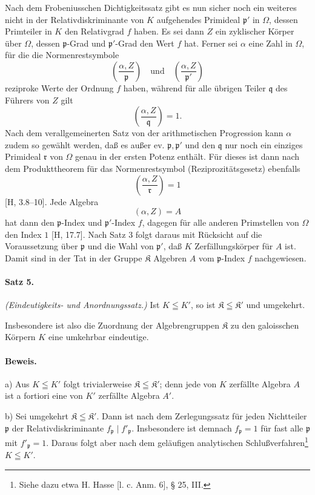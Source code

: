 Nach dem Frobeniusschen Dichtigkeitssatz gibt es nun sicher noch ein weiteres nicht in der Relativdiskriminante von \(K\) aufgehendes Primideal \(\mathfrak p'\) in \(\Omega\), dessen Primteiler in \(K\) den Relativgrad \(f\) haben. Es sei dann \(Z\) ein zyklischer Körper über \(\Omega\), dessen \(\mathfrak p\)-Grad und \(\mathfrak p'\)-Grad den Wert \(f\) hat. Ferner sei \(\alpha\) eine Zahl in \(\Omega\), für die die Normenrestsymbole
\[
\left(\frac{\alpha,Z}{\mathfrak p}\right)\quad\text{und}\quad
\left(\frac{\alpha,Z}{\mathfrak p'}\right)
\]
reziproke Werte der Ordnung \(f\) haben, während für alle übrigen Teiler \(\mathfrak q\) des Führers von \(Z\) gilt
\[
\left(\frac{\alpha,Z}{\mathfrak q}\right)=1.
\]
Nach dem verallgemeinerten Satz von der arithmetischen Progression kann \(\alpha\) zudem so gewählt werden, daß es außer ev. \(\mathfrak p,\mathfrak p'\) und den \(\mathfrak q\) nur noch ein einziges Primideal \(\mathfrak r\) von \(\Omega\) genau in der ersten Potenz enthält. Für dieses ist dann nach dem Produkttheorem für das Normenrestsymbol (Reziprozitätsgesetz) ebenfalls
\[
\left(\frac{\alpha,Z}{\mathfrak r}\right)=1
\]
[H, 3.8--10]. Jede Algebra
\[
        (\alpha,Z)=A
\]
hat dann den \(\mathfrak p\)-Index und \(\mathfrak p'\)-Index \(f\), dagegen für alle anderen Primstellen von \(\Omega\) den Index \(1\) [H, 17.7]. Nach Satz 3 folgt daraus mit Rücksicht auf die Voraussetzung über \(\mathfrak p\) und die Wahl von \(\mathfrak p'\), daß \(K\) Zerfällungskörper für \(A\) ist. Damit sind in der Tat in der Gruppe \(\mathfrak K\) Algebren \(A\) vom \(\mathfrak p\)-Index \(f\) nachgewiesen.

\paragraph{Satz 5.}
\emph{(Eindeutigkeits- und Anordnungssatz.)} Ist \(K\leqq K'\), so ist \(\mathfrak K\leqq\mathfrak K'\) und umgekehrt.

Insbesondere ist also die Zuordnung der Algebrengruppen \(\mathfrak K\) zu den galoisschen Körpern \(K\) eine umkehrbar eindeutige.

\paragraph{Beweis.}
a) Aus \(K\leqq K'\) folgt trivialerweise \(\mathfrak K\leqq\mathfrak K'\); denn jede von \(K\) zerfällte Algebra \(A\) ist a fortiori eine von \(K'\) zerfällte Algebra \(A'\).

b) Sei umgekehrt \(\mathfrak K\leqq\mathfrak K'\). Dann ist nach dem Zerlegungssatz für jeden Nichtteiler \(\mathfrak p\) der Relativdiskriminante \(f_{\mathfrak p}\mid f'_{\mathfrak p}\). Insbesondere ist demnach \(f_{\mathfrak p}=1\) für fast alle \(\mathfrak p\) mit \(f'_{\mathfrak p}=1\). Daraus folgt aber nach dem geläufigen analytischen Schlußverfahren\footnote{Siehe dazu etwa H. Hasse [l. c. Anm. 6], § 25, III.} \(K\leqq K'\).

